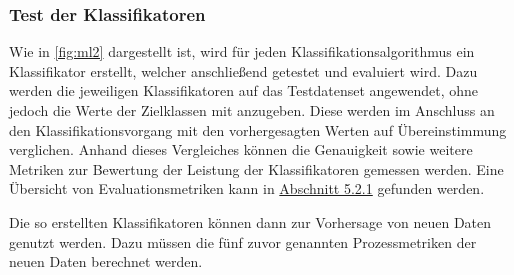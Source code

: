 \subsubsection*{Test der Klassifikatoren}

Wie in \autoref{fig:ml2} dargestellt ist, wird für jeden Klassifikationsalgorithmus ein Klassifikator erstellt, welcher anschließend getestet und evaluiert wird. Dazu werden die jeweiligen Klassifikatoren auf das Testdatenset angewendet, ohne jedoch die Werte der Zielklassen mit anzugeben. Diese werden im Anschluss an den Klassifikationsvorgang mit den vorhergesagten Werten auf Übereinstimmung verglichen. Anhand dieses Vergleiches können die Genauigkeit sowie weitere Metriken zur Bewertung der Leistung der Klassifikatoren gemessen werden. Eine Übersicht von Evaluationsmetriken kann in \hyperref[eval-metrics]{Abschnitt 5.2.1} gefunden werden.

Die so erstellten Klassifikatoren können dann zur Vorhersage von neuen Daten genutzt werden. Dazu müssen die fünf zuvor genannten Prozessmetriken der neuen Daten berechnet werden. 

\cleardoublepage
